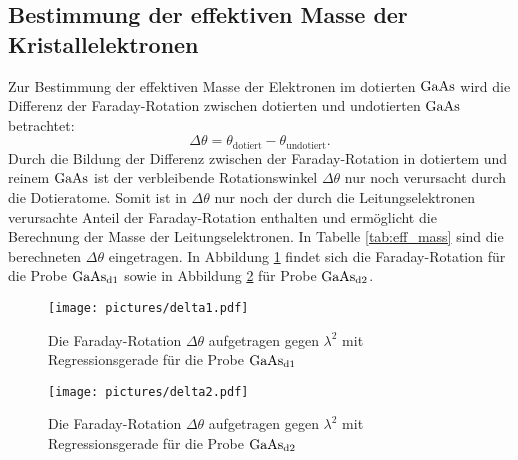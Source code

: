 \subsection{Bestimmung der effektiven Masse der Kristallelektronen}
Zur Bestimmung der effektiven Masse der Elektronen im dotierten $\ce{GaAs}$ wird die Differenz der Faraday-Rotation zwischen dotierten und undotierten $\ce{GaAs}$ betrachtet:
\begin{equation}
\Delta \theta=\theta_{\mathrm{dotiert}}-\theta_{\mathrm{undotiert}}\mathrm{.}
\end{equation}
Durch die Bildung der Differenz zwischen der Faraday-Rotation in dotiertem und reinem $\ce{GaAs}$ ist der verbleibende Rotationswinkel $\Delta\theta$ nur noch verursacht durch die Dotieratome.
Somit ist in $\Delta\theta$ nur noch der durch die Leitungselektronen verursachte Anteil der Faraday-Rotation enthalten und ermöglicht die Berechnung der Masse der Leitungselektronen.
In Tabelle \ref{tab:eff_mass} sind die berechneten $\Delta\theta$ eingetragen. In Abbildung \ref{fig:delta1} findet sich die Faraday-Rotation für die Probe $\ce{GaAs}_{\mathrm{d1}}$ sowie in Abbildung \ref{fig:delta2}
für Probe $\ce{GaAs}_{\mathrm{d2}}$.

\begin{figure}
  \centering
  \texttt{[image: pictures/delta1.pdf]}
  \caption{Die Faraday-Rotation $\Delta \theta$ aufgetragen gegen $\lambda^{2}$ mit Regressionsgerade für die Probe $\ce{GaAs}_{\mathrm{d1}}$}
  \label{fig:delta1}
\end{figure}
\begin{figure}
  \centering
  \texttt{[image: pictures/delta2.pdf]}
  \caption{Die Faraday-Rotation $\Delta \theta$ aufgetragen gegen $\lambda^{2}$ mit Regressionsgerade für die Probe $\ce{GaAs}_{\mathrm{d2}}$}
  \label{fig:delta2}
\end{figure}

